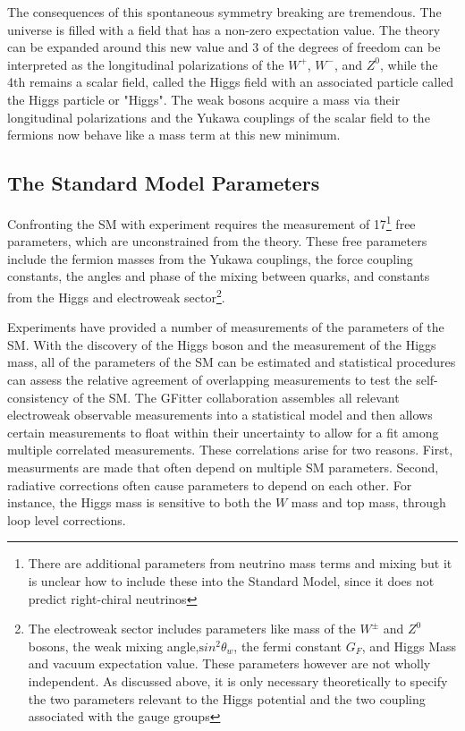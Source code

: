 The consequences of this spontaneous symmetry breaking are tremendous.
The universe is filled with a field that has a non-zero expectation value.
The theory can be expanded around this new value and 3 of the
degrees of freedom can be interpreted as the longitudinal polarizations of
the $W^+$, $W^-$, and $Z^0$, while the 4th remains a scalar field, called
the Higgs field with an associated particle called the Higgs particle or "Higgs".
The weak bosons acquire a mass via their longitudinal polarizations and the Yukawa
couplings of the scalar field to the fermions now behave like a mass term
at this new minimum. 


\subsection{The Standard Model Parameters}


Confronting the SM with experiment requires the measurement of
17\footnote{There are additional parameters from neutrino mass terms and
mixing but it is unclear how to include these into the Standard Model,
since it does not predict right-chiral neutrinos} free parameters, which
are unconstrained from the theory. These free parameters include the fermion
masses from the Yukawa couplings, the force coupling constants, the angles and phase of the mixing between
quarks, and constants from the Higgs and electroweak sector\footnote{ The electroweak sector includes
parameters like mass of the $W^{\pm}$ and $Z^0$ bosons, the weak mixing
angle,${\mathrm sin^2}\theta_w$, the fermi constant $G_F$, and Higgs
Mass and vacuum expectation value. These parameters however are not
wholly independent. As discussed above, it is only necessary
theoretically to specify the two parameters relevant to the Higgs
potential and the two coupling associated with the gauge groups }.

Experiments have provided a number of measurements of the
parameters of the SM\cite{lepew:2010vi}.  With the discovery of the Higgs boson and 
the measurement of the Higgs mass, all of the parameters
of the SM can be estimated and statistical procedures can assess
the relative agreement of overlapping measurements to test the self-consistency 
of the SM. The GFitter collaboration assembles
all relevant electroweak observable measurements into a statistical
model and then allows certain measurements to float within their
uncertainty to allow for a fit among multiple correlated measurements\cite{GFitter}. 
These correlations arise for two reasons. First, measurments are made that often
depend on multiple SM parameters. Second, radiative corrections often cause 
parameters to depend on each other. For instance, the Higgs mass is sensitive
to both the $W$ mass and top mass, through loop level corrections. 

